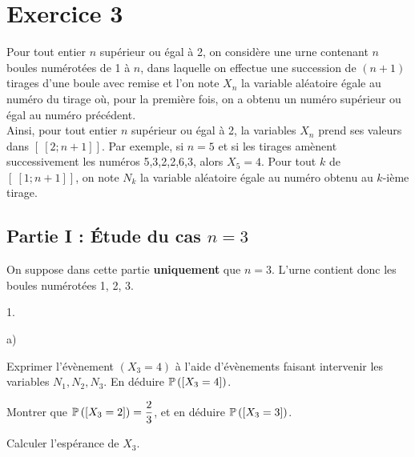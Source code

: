 \documentclass[11pt]{article}%
\begin{document}
\newpage

\section*{Exercice 3}

\noindent Pour tout entier $n$ supérieur ou égal à 2, on considère une
urne contenant $n$ boules numérotées de 1 à $n$, dans laquelle on
effectue une succession de $(n + 1)$ tirages d'une boule avec remise et
l'on note $X_{n}$ la variable aléatoire égale au numéro du tirage où,
pour la première fois, on a obtenu un numéro supérieur ou égal au
numéro précédent.\\
Ainsi, pour tout entier $n$ supérieur ou égal à 2, la variables $X_{n}$
prend ses valeurs dans $[ \ \![2;n + 1]\!]$. Par exemple, si $n = 5$ et
si les tirages amènent successivement les numéros 5,3,2,2,6,3, alors
$X_{5} = 4$. Pour tout $k$ de $[ \ \![1;n + 1]\!]$, on note $N_{k}$ la
variable aléatoire égale au numéro obtenu au $k$-ième tirage.
\subsection*{Partie I : Étude du cas $n = 3$}
\noindent On suppose dans cette partie {\bf uniquement} que $n = 3$.
L'urne contient donc les boules numérotées 1, 2, 3.
\begin{noliste}{1.}
 \setlength{\itemsep}{4mm}
\item
\begin{noliste}{a)}
 \setlength{\itemsep}{2mm}
\item Exprimer l'évènement $(X_{3} = 4)$ à l'aide d'évènements faisant
intervenir les variables $N_{1}, N_{2}, N_{3}$. En déduire
$\mathbb{P}\left(\left[ {X_{3} = 4} \right]\right)$.
\item Montrer que $\mathbb{P}\left(\left[ {X_{3} = 2} \right]\right) = \dfrac{2}{3}$, et
en déduire $\mathbb{P}\left(\left[ {X_{3} = 3} \right]\right)$.
\end{noliste}
\item Calculer l'espérance de $X_{3}$.
\end{noliste}
\end{document}
